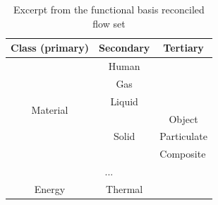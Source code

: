 \begin{table}[t] \small
\centering
\caption{Excerpt from the functional basis reconciled flow set}
\label{tab:fbed_flow}
\begin{tabular}{|c|c|c|}
\hline
Class (primary)              & Secondary                    & Tertiary                         \\ \hline
\multirow{6}{*}{Material}    & Human                        &                                  \\ \cline{2-3} 
                             & Gas                          &                                  \\ \cline{2-3} 
                             & Liquid                       &                                  \\ \cline{2-3} 
                             & \multirow{3}{*}{Solid}       & Object                           \\ \cline{3-3} 
                             &                              & \multicolumn{1}{l|}{Particulate} \\ \cline{3-3} 
                             &                              & \multicolumn{1}{l|}{Composite}   \\ \hline
\multicolumn{3}{|c|}{...}                                                                      \\ \hline
Energy & Thermal &             \\ \hline
\end{tabular}
\end{table}

